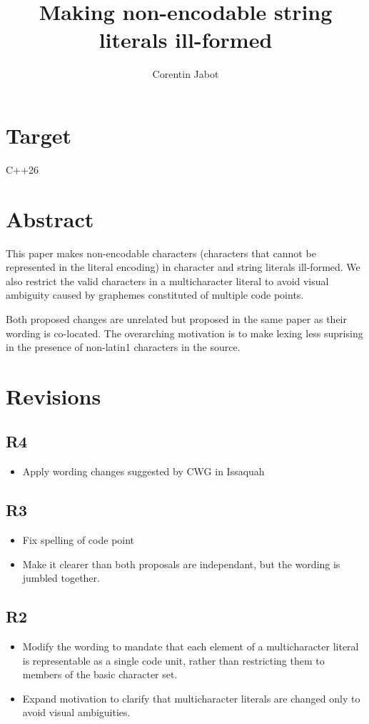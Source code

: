 \documentclass{wg21}
\title{Making non-encodable string literals ill-formed}
\author{Corentin Jabot}{corentin.jabot@gmail.com}
\begin{document}
    \maketitle


\section{Target}

C++26

\section{Abstract}

This paper makes non-encodable characters (characters that cannot be represented in the literal encoding) in character and string literals ill-formed.
We also restrict the valid characters in a multicharacter literal to avoid visual ambiguity caused by graphemes constituted of multiple code points.

Both proposed changes are unrelated but proposed in the same paper as their wording is co-located.
The overarching motivation is to make lexing less suprising in the presence of non-latin1 characters in the source.

\section{Revisions}

\subsection{R4}
\begin{itemize}
\item Apply wording changes suggested by CWG in Issaquah
\end{itemize}


\subsection{R3}
\begin{itemize}
\item Fix spelling of code point
\item Make it clearer than both proposals are independant, but the wording is jumbled together.
\end{itemize}

\subsection{R2}
\begin{itemize}
\item Modify the wording to mandate that each element of a multicharacter literal is representable as a single code unit,
rather than restricting them to members of the basic character set.
\item Expand motivation to clarify that multicharacter literals are changed only to avoid visual ambiguities.
\end{itemize}
\end{document}

